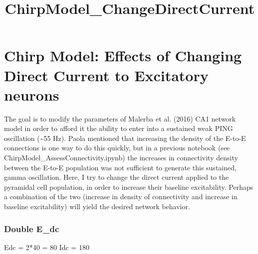 \documentclass[11pt]{article}
\title{ChirpModel\_ChangeDirectCurrent}
\begin{document}
    
    
    \maketitle
    
    

    
    \section{Chirp Model: Effects of Changing Direct Current to Excitatory
neurons}\label{chirp-model-effects-of-changing-direct-current-to-excitatory-neurons}

 The goal is to modify the parameters of Malerba et al. (2016) CA1
network model in order to afford it the ability to enter into a
sustained weak PING oscillation (\textasciitilde{}55 Hz). Paola
mentioned that increasing the density of the E-to-E connections is one
way to do this quickly, but in a previous notebook (see
ChirpModel\_AssessConnectivity.ipynb) the increases in connectivity
density between the E-to-E population was not sufficient to generate
this sustained, gamma oscillation. Here, I try to change the direct
current applied to the pyramidal cell population, in order to increase
their baseline excitability. Perhaps a combination of the two (increase
in density of connectivity and increase in baseline excitability) will
yield the desired network behavior.

    \subsubsection{Double E\_dc}\label{double-e_dc}

 Edc = 2*40 = 80 Idc = 180
\end{document}
